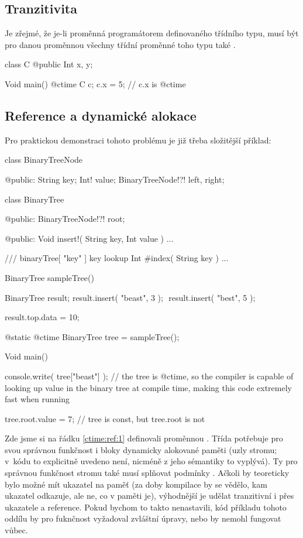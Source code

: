 \subsection{Tranzitivita \ctime}
Je zřejmé, že je-li proměnná \ctime programátorem definovaného třídního typu, musí být pro danou proměnnou všechny třídní proměnné toho typu také \ctime.

\begin{code}
class C {
	@public Int x, y;
}

Void main() {
	@ctime C c;
	c.x = 5; // c.x is @ctime
}
\end{code}

\subsection{Reference a dynamické alokace} \label{ctime:ref}
Pro praktickou demonstraci tohoto problému je již třeba složitější příklad: \nopagebreak

\begin{code}
class BinaryTreeNode {
	
@public:
	String key;
	Int! value;
	BinaryTreeNode!?! left, right;
	
}
	
class BinaryTree {

@public:
	BinaryTreeNode!?! root;
	
@public:
	Void insert!( String key, Int value ) { ... }
	
	/// binaryTree[ "key" ] key lookup
	Int #index( String key ) { ... }

}

BinaryTree sampleTree() {
	BinaryTree result;
	result.insert( "beast", 3 ); $\label{ctime:ref:2}$
	result.insert( "best", 5 ); $\label{ctime:ref:3}$
	
	result.top.data = 10;
}

@static @ctime BinaryTree tree = sampleTree(); $\label{ctime:ref:1}$

Void main() {
	console.write( tree["beast"] ); // the tree is @ctime, so the compiler is capable of looking up value in the binary tree at compile time, making this code extremely fast when running
	
	tree.root.value = 7; // tree is const, but tree.root is not $\label{ctime:ref:4}$
}
\end{code}

Zde jsme si na řádku \ref{ctime:ref:1} definovali \ctime proměnnou .  Třída  potřebuje pro svou správnou funkčnost i bloky dynamicky alokované paměti (uzly stromu; v~kódu to explicitně uvedeno není, nicméně z jeho sémantiky to vyplývá). Ty pro správnou funkčnost stromu také musí splňovat podmínky \ctime. Ačkoli by teoreticky bylo možné mít \ctime ukazatel na \nonctime paměť (za doby kompilace by se vědělo, kam ukazatel odkazuje, ale ne, co v paměti je), výhodnější je udělat \ctime tranzitivní i přes ukazatele a reference. Pokud bychom to takto nenastavili, kód příkladu tohoto oddílu by pro fuknčnost vyžadoval zvláštní úpravy, nebo by nemohl fungovat vůbec.

